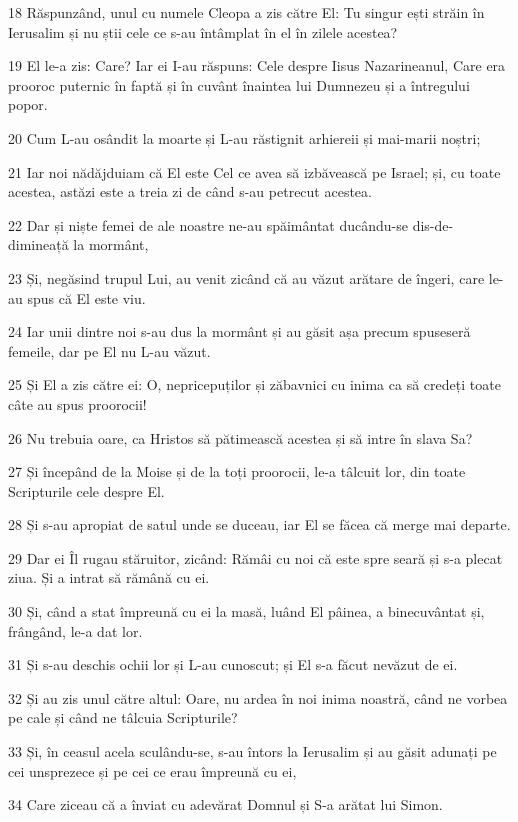 \par 18 Răspunzând, unul cu numele Cleopa a zis către El: Tu singur ești străin în Ierusalim și nu știi cele ce s-au întâmplat în el în zilele acestea?
\par 19 El le-a zis: Care? Iar ei I-au răspuns: Cele despre Iisus Nazarineanul, Care era prooroc puternic în faptă și în cuvânt înaintea lui Dumnezeu și a întregului popor.
\par 20 Cum L-au osândit la moarte și L-au răstignit arhiereii și mai-marii noștri;
\par 21 Iar noi nădăjduiam că El este Cel ce avea să izbăvească pe Israel; și, cu toate acestea, astăzi este a treia zi de când s-au petrecut acestea.
\par 22 Dar și niște femei de ale noastre ne-au spăimântat ducându-se dis-de-dimineață la mormânt,
\par 23 Și, negăsind trupul Lui, au venit zicând că au văzut arătare de îngeri, care le-au spus că El este viu.
\par 24 Iar unii dintre noi s-au dus la mormânt și au găsit așa precum spuseseră femeile, dar pe El nu L-au văzut.
\par 25 Și El a zis către ei: O, nepricepuților și zăbavnici cu inima ca să credeți toate câte au spus proorocii!
\par 26 Nu trebuia oare, ca Hristos să pătimească acestea și să intre în slava Sa?
\par 27 Și începând de la Moise și de la toți proorocii, le-a tâlcuit lor, din toate Scripturile cele despre El.
\par 28 Și s-au apropiat de satul unde se duceau, iar El se făcea că merge mai departe.
\par 29 Dar ei Îl rugau stăruitor, zicând: Rămâi cu noi că este spre seară și s-a plecat ziua. Și a intrat să rămână cu ei.
\par 30 Și, când a stat împreună cu ei la masă, luând El pâinea, a binecuvântat și, frângând, le-a dat lor.
\par 31 Și s-au deschis ochii lor și L-au cunoscut; și El s-a făcut nevăzut de ei.
\par 32 Și au zis unul către altul: Oare, nu ardea în noi inima noastră, când ne vorbea pe cale și când ne tâlcuia Scripturile?
\par 33 Și, în ceasul acela sculându-se, s-au întors la Ierusalim și au găsit adunați pe cei unsprezece și pe cei ce erau împreună cu ei,
\par 34 Care ziceau că a înviat cu adevărat Domnul și S-a arătat lui Simon.
